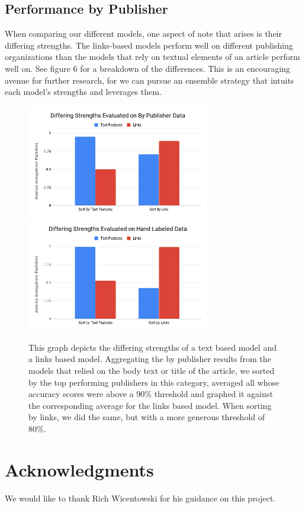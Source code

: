 \documentclass[11pt,a4paper]{article}
\begin{document}
\subsection{Performance by Publisher}
When comparing our different models, one aspect of note that arises is their differing strengths. The links-based models perform well on different publishing organizations than the models that rely on textual elements of an article perform well on. See figure 6 for a breakdown of the differences. This is an encouraging avenue for further research, for we can pursue an ensemble strategy that intuits each model's strengths and leverages them. 
\begin{figure}[ht]
\caption{This graph depicts the differing strengths of a text based model and a links based model. Aggregating the by publisher results from the models that relied on the body text or title of the article, we sorted by the top performing publishers in this category, averaged all whose accuracy scores were above a 90\% threshold and graphed it against the corresponding average for the links based model. When sorting by links, we did the same, but with a more generous threshold of 80\%.}
\includegraphics[width=8cm]{images/links_vs_article_by_pub.png}
\includegraphics[width=8cm]{images/links_vs_article_by_hand.png}
\end{figure}

\section*{Acknowledgments}

We would like to thank Rich Wicentowski for his guidance on this project.



\end{document}
